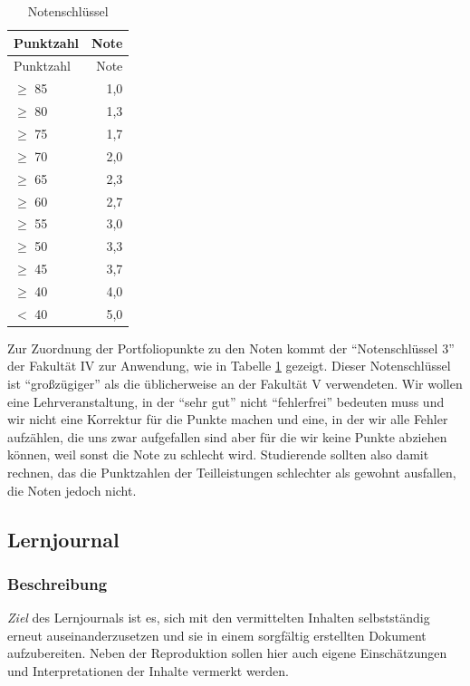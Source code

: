 \documentclass[DIV=15,headinclude=true]{scrartcl}
\begin{document}
\begin{table}\centering
	\label{tab:notenschluessel}
	\caption{Notenschlüssel}
	\begin{tabular}{lr}
		\toprule
		Punktzahl   & Note \\
		\midrule
		Punktzahl   & Note \\
		\(\geq\) 85 & 1,0  \\
		\(\geq\) 80 & 1,3  \\
		\(\geq\) 75 & 1,7  \\
		\(\geq\) 70 & 2,0  \\
		\(\geq\) 65 & 2,3  \\
		\(\geq\) 60 & 2,7  \\
		\(\geq\) 55 & 3,0  \\
		\(\geq\) 50 & 3,3  \\
		\(\geq\) 45 & 3,7  \\
		\(\geq\) 40 & 4,0  \\
		\(<\) 40    & 5,0  \\
		\bottomrule
	\end{tabular}
\end{table}

Zur Zuordnung der Portfoliopunkte zu den Noten kommt der
\enquote{Notenschlüssel 3} der Fakultät IV zur Anwendung, wie in Tabelle
\ref{tab:notenschluessel} gezeigt. Dieser
Notenschlüssel ist \enquote{großzügiger} als die üblicherweise an der
Fakultät V verwendeten. Wir wollen eine Lehrveranstaltung, in der
\enquote{sehr gut} nicht \enquote{fehlerfrei} bedeuten muss und wir
nicht eine Korrektur für die Punkte machen und eine, in der wir alle
Fehler aufzählen, die uns zwar aufgefallen sind aber für die wir keine
Punkte abziehen können, weil sonst die Note zu schlecht wird.
Studierende sollten also damit rechnen, das die Punktzahlen der
Teilleistungen schlechter als gewohnt ausfallen, die Noten jedoch nicht.

\subsection{Lernjournal}

\subsubsection{Beschreibung}

\emph{Ziel} des Lernjournals ist es, sich mit den vermittelten Inhalten
selbstständig erneut auseinanderzusetzen und sie in einem sorgfältig
erstellten Dokument aufzubereiten. Neben der Reproduktion sollen hier
auch eigene Einschätzungen und Interpretationen der Inhalte vermerkt
werden.
\end{document}
